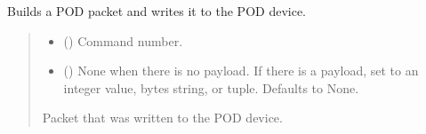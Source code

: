 \documentclass[letterpaper,10pt,english]{sphinxmanual}
\begin{document}
\begin{fulllineitems}
\begin{fulllineitems}
\label{\detokenize{PodApi.Devices:PodApi.Devices.BasicPodProtocol.Pod.WritePacket}}
\pysigstartsignatures
{}
\pysigstopsignatures
\sphinxAtStartPar
Builds a POD packet and writes it to the POD device.
\begin{quote}\begin{description}
\begin{itemize}
\item {} 
\sphinxAtStartPar
{} (\sphinxstyleliteralemphasis{\sphinxupquote{ | }}) \textendash{} Command number.

\item {} 
\sphinxAtStartPar
{} (\sphinxstyleliteralemphasis{\sphinxupquote{ | }}\sphinxstyleliteralemphasis{\sphinxupquote{ | }}\sphinxstyleliteralemphasis{\sphinxupquote{{[}}}\sphinxstyleliteralemphasis{\sphinxupquote{ | }}\sphinxstyleliteralemphasis{\sphinxupquote{{]}}}\sphinxstyleliteralemphasis{\sphinxupquote{, }}) \textendash{} None when there is no payload. If there                 is a payload, set to an integer value, bytes string, or tuple. Defaults to None.

\end{itemize}

\sphinxAtStartPar
Packet that was written to the POD device.


\end{description}
\end{quote}
\end{fulllineitems}
\end{fulllineitems}
\end{document}
